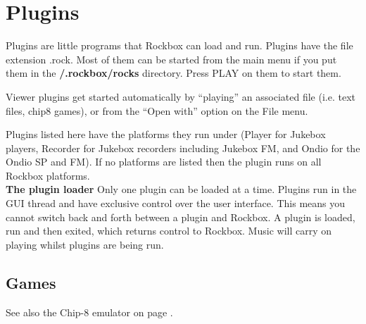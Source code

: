 \chapter{Plugins}
\newpage
Plugins are little programs that Rockbox can load and run. Plugins have
the file extension .rock.  Most of them can be started from the main
menu if you put them in the \textbf{/.rockbox/rocks} directory. Press
PLAY on them to start them. 

Viewer plugins get started automatically by
``playing'' an associated file (i.e. text
files, chip8 games), or from the ``Open with'' option on the File menu.

Plugins listed here have the platforms they run under (Player for
Jukebox players, Recorder for Jukebox recorders including Jukebox FM,
and Ondio for the Ondio SP and FM).  If no platforms are listed then
the plugin runs on all Rockbox platforms.\\

\textbf{The plugin loader}
Only one plugin can be loaded at a time. Plugins run in the GUI thread
and have exclusive control over the user interface. This means you
cannot switch back and forth between a plugin and Rockbox. A plugin is
loaded, run and then exited, which returns control to Rockbox.  Music
will carry on playing whilst plugins are being run.

\section{Games}
See also the Chip{}-8 emulator on page \pageref{ref:Chip8emulator}.










